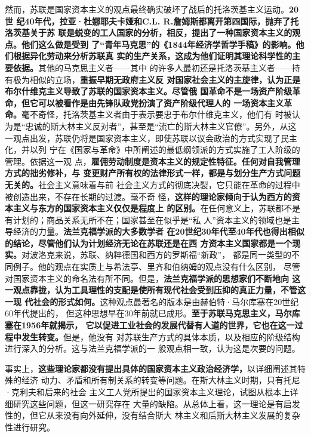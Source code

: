 然而，苏联是国家资本主义的观点最终确实破坏了战后的托洛茨基主义运动。\textbf{20世
  纪40年代，拉亚·杜娜耶夫卡娅和C.L. R.詹姆斯都离开第四国际，抛弃了托洛茨基关于苏
  联是蜕变的工人国家的分析，相反，提出了一种国家资本主义的观点。他们这么做是受到
  了“青年马克思”的《1844年经济学哲学手稿》的影响。他们根据异化劳动来分析苏联真
  实的生产关系，这成为他们证明其理论科学性的主要依据。}其他的马克思主义者——其中
的许多人最初还是托洛茨基主义者——持有极为相似的立场，\textbf{重振早期无政府主义反
  对国家社会主义的主旋律，认为正是布尔什维克主义导致了苏联的国家资本主义。尽管俄
  国革命不是一场资产阶级革命，但它可以被看作是由先锋队政党扮演了资产阶级代理人的
  一场资本主义革命。}毫不奇怪，托洛茨基主义者由于表示要忠于布尔什维克主义，他们有
时被认为是“忠诚的斯大林主义反对者”，甚至是“流亡的斯大林主义官僚”。另外，从这
一观点出发，苏联仍将是国家资本主义，即使苏联以议会政治的方式实现了民主化，并以列
宁在《国家与革命》中所阐述的最低纲领派的方式实施了工人阶级的管理。依据这一观
点，\textbf{雇佣劳动制度是资本主义的规定性特征。任何对自我管理方式的拙劣修补，与
  变更财产所有权的法律形式一样，都是与划分生产方式问题无关的。}社会主义意味着与前
社会主义方式的彻底决裂，它只能在革命的过程中被创造出来，不存在长期的过渡。毫不奇
怪，\textbf{这样的理论家倾向于认为西方的资本主义与东方的国家资本主义仅仅是程度上
  的区别。}在任何意义上，苏联都不是有计划的；商品关系无所不在；国家甚至在似乎是“私
人”资本主义的领域也是主导经济的力量。\textbf{法兰克福学派的大多数学者
  在20世纪30年代至40年代也得出相似的结论，尽管他们认为计划经济无论在苏联还是在西
  方资本主义国家都是一个现实。}对波洛克来说，苏联、纳粹德国和西方的罗斯福“新政”，
都是同一类型的不同例子。他的观点在实质上与希法亭、里齐和伯纳姆的观点没有什么区别，
尽管对国家资本主义的命名法有所不同。但是，\textbf{法兰克福学派的思想家们不断地向
  这一观点靠拢，认为工具理性的支配是使所有现代社会受到压抑的真正力量，不管这一现
  代社会的形式如何。}这种观点最著名的版本是由赫伯特·马尔库塞在20世纪60年代提出的，
但这种思想早在30年前就已成形。\textbf{至于苏联马克思主义，马尔库塞在1956年就揭示，
  它以促进工业社会的发展代替有人道的世界，它也在这一过程中发生转变。}但是，他没有
对苏联生产方式的具体本质，以及相应的阶级结构进行深入的分析。这与法兰克福学派的一
般观点相一致，认为这是次要的问题。

事实上，\textbf{这些理论家都没有提出具体的国家资本主义政治经济学，}以详细阐述其特殊的经济
动力、矛盾和所有制关系的转变等问题。在斯大林主义时期，只有托尼·克利夫和后来的社会
主义工人党所提出的国家资本主义理论，试图从根本上详细研究这些问题，但这一研究存在
大量的缺陷。从总体上看，这一理论是有启发性的，但它从来没有向外延伸，没有结合斯大
林主义和后斯大林主义发展的复杂性进行研究。

